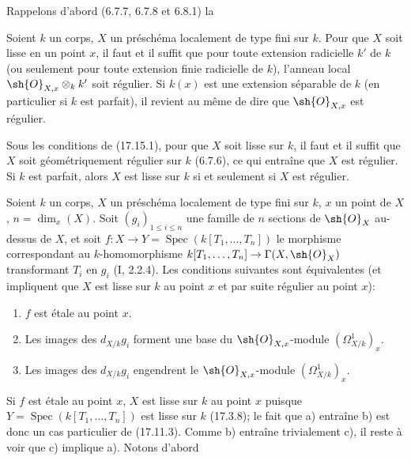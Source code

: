 Rappelons d'abord (6.7.7, 6.7.8 et 6.8.1) la

\begin{proposition}[17.15.1]
\label{IV.17.15.1}
Soient $k$ un corps, $X$ un préschéma localement de type fini sur $k$. Pour que $X$ soit lisse en un point $x$, il faut et il suffit que pour toute extension radicielle $k'$ de $k$ (ou seulement pour toute extension finie radicielle de $k$), l'anneau local $\sh{O}_{X,x}\otimes_k k'$ soit régulier. Si $k(x)$ est une extension séparable de $k$ (en particulier si $k$ est parfait), il revient au même de dire que $\sh{O}_{X,x}$ est régulier.
\end{proposition}

\begin{corollary}[17.15.2]
\label{IV.17.15.2}
Sous les conditions de (17.15.1), pour que $X$ soit lisse sur $k$, il faut et il suffit que $X$ soit géométriquement régulier sur $k$ (6.7.6), ce qui entraîne que $X$ est régulier. Si $k$ est parfait, alors $X$ est lisse sur $k$ si et seulement si $X$ est régulier.
\end{corollary}

\begin{proposition}[17.15.3]
\label{IV.17.15.3}
Soient $k$ un corps, $X$ un préschéma localement de type fini sur $k$, $x$ un point de $X$, $n=\dim_x(X)$. Soit $(g_i)_{1\leq i\leq n}$ une famille de $n$ sections de $\sh{O}_X$ au-dessus de $X$, et soit $f:X\to Y=\operatorname{Spec}(k[T_1,\ldots,T_n])$ le morphisme correspondant au $k$-homomorphisme $k[T_1,\ldots,T_n]\to\Gamma(X,\sh{O}_X)$ transformant $T_i$ en $g_i$ (I, 2.2.4). Les conditions suivantes sont équivalentes (et impliquent que $X$ est lisse sur $k$ au point $x$ et par suite régulier au point $x$):
\begin{enumerate}
  \item[a)] $f$ est étale au point $x$.
  \item[b)] Les images des $d_{X/k}g_i$ forment une base du $\sh{O}_{X,x}$-module $(\Omega^1_{X/k})_x$.
  \item[c)] Les images des $d_{X/k}g_i$ engendrent le $\sh{O}_{X,x}$-module $(\Omega^1_{X/k})_x$.
\end{enumerate}
\end{proposition}

Si $f$ est étale au point $x$, $X$ est lisse sur $k$ au point $x$ puisque $Y=\operatorname{Spec}(k[T_1,\ldots,T_n])$ est lisse sur $k$ (17.3.8); le fait que a) entraîne b) est donc un cas particulier de (17.11.3). Comme b) entraîne trivialement c), il reste à voir que c) implique a). Notons d'abord

